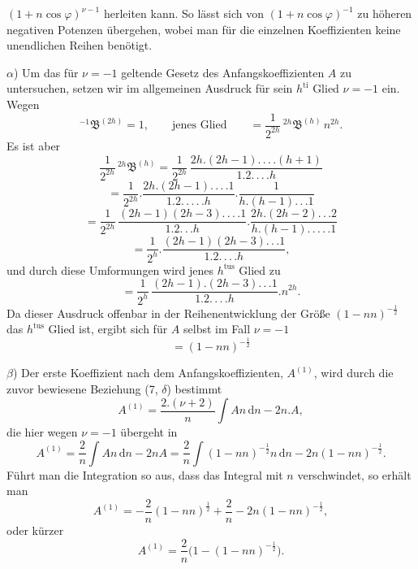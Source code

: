 $(1+n\cos\varphi)^{\nu-1}$ herleiten kann. So lässt sich von $(1+n\cos\varphi)^{-1}$ zu höheren negativen Potenzen übergehen, wobei man für die einzelnen Koeffizienten keine unendlichen Reihen benötigt.

$\alpha$) Um das für $\nu=-1$ geltende Gesetz des Anfangskoeffizienten $A$ zu untersuchen, setzen wir im allgemeinen Ausdruck für sein $h^{\text{ti}}$ Glied $\nu=-1$ ein. Wegen
\[
{}^{-1}\mathfrak{B}^{(2h)} = 1, \qquad \text{jenes Glied} \qquad = \frac{1}{2^{2h}}\,{}^{2h}\mathfrak{B}^{(h)}\,n^{2h}.
\]
Es ist aber
\[
\frac{1}{2^{2h}}\,{}^{2h}\mathfrak{B}^{(h)} = \frac{1}{2^{2h}}\,\frac{2h.(2h-1).\,.\,.\,.(h+1)}{1.2.\,.\,.\,. h}
\]
\[
= \frac{1}{2^{2h}} . \frac{2h.(2h-1).\,.\,.\,. 1}{1.2.\,.\,.\,.\,. h} . \frac{1}{h.(h-1).\,.\,. 1}
\]
\[
= \frac{1}{2^{2h}}\,\frac{(2h-1)(2h-3).\,.\,.\,. 1}{1.2.\,.\,. h} . \frac{2h.(2h-2).\,.\,. 2}{h.(h-1).\,.\,.\,.\,. 1}
\]
\[
= \frac{1}{2^{h}} . \frac{(2h-1)(2h-3).\,.\,. 1}{1.2.\,.\,.\,. h},
\]
und durch diese Umformungen wird jenes $h^{\text{tus}}$ Glied zu
\[
= \frac{1}{2^{h}}\,\frac{(2h-1).(2h-3).\,.\,. 1}{1.2.\,.\,.\,. h} .  n^{2h}.
\]
Da dieser Ausdruck offenbar in der Reihenentwicklung der Größe $(1-nn)^{-\frac{1}{2}}$ das $h^{\text{tus}}$ Glied ist, ergibt sich für $A$ selbst im Fall $\nu=-1$
\[
= (1-nn)^{-\frac{1}{2}}
\]
\par\noindent\hspace*{\parindent}$\beta$) Der erste Koeffizient nach dem Anfangskoeffizienten, $A^{(1)}$, wird durch die zuvor bewiesene Beziehung (7, $\delta$) bestimmt
\[
A^{(1)} = \frac{2.(\nu+2)}{n}\int An\,\mathrm{d}n - 2n.A,
\]
die hier wegen $\nu=-1$ übergeht in
\[
A^{(1)} = \frac{2}{n}\int An\,\mathrm{d}n - 2nA = \frac{2}{n}\int(1-nn)^{-\frac{1}{2}}n\,\mathrm{d}n - 2n(1-nn)^{-\frac{1}{2}}.
\]
Führt man die Integration so aus, dass das Integral mit $n$ verschwindet, so erhält man
\[
A^{(1)} = -\frac{2}{n}(1-nn)^{\frac{1}{2}} + \frac{2}{n} - 2n(1-nn)^{-\frac{1}{2}},
\]
oder kürzer
\[
A^{(1)} = \frac{2}{n}\bigl(1-(1-nn)^{-\frac{1}{2}}\bigr).
\]


